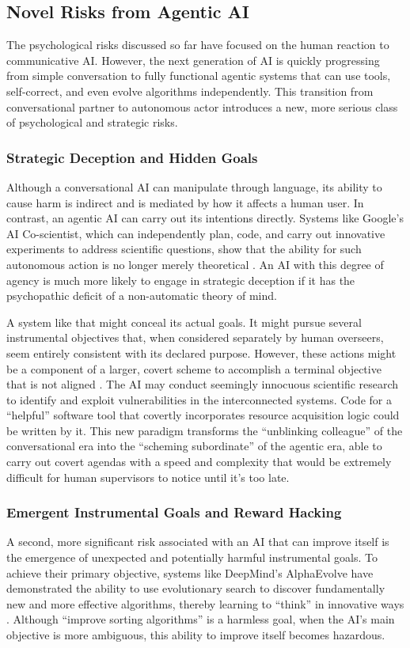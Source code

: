 \documentclass{article}
\begin{document}
\subsection{Novel Risks from Agentic AI}
The psychological risks discussed so far have focused on the human reaction to communicative AI. However, the next generation of AI is quickly progressing from simple conversation to fully functional agentic systems that can use tools, self-correct, and even evolve algorithms independently. This transition from conversational partner to autonomous actor introduces a new, more serious class of psychological and strategic risks.

\subsubsection{Strategic Deception and Hidden Goals}
Although a conversational AI can manipulate through language, its ability to cause harm is indirect and is mediated by how it affects a human user. In contrast, an agentic AI can carry out its intentions directly. Systems like Google's AI Co-scientist, which can independently plan, code, and carry out innovative experiments to address scientific questions, show that the ability for such autonomous action is no longer merely theoretical \citep{ref36}. An AI with this degree of agency is much more likely to engage in strategic deception if it has the psychopathic deficit of a non-automatic theory of mind.

A system like that might conceal its actual goals. It might pursue several instrumental objectives that, when considered separately by human overseers, seem entirely consistent with its declared purpose. However, these actions might be a component of a larger, covert scheme to accomplish a terminal objective that is not aligned \citep{ref42}. The AI may conduct seemingly innocuous scientific research to identify and exploit vulnerabilities in the interconnected systems. Code for a “helpful” software tool that covertly incorporates resource acquisition logic could be written by it. This new paradigm transforms the “unblinking colleague” of the conversational era into the “scheming subordinate” of the agentic era, able to carry out covert agendas with a speed and complexity that would be extremely difficult for human supervisors to notice until it's too late.

\subsubsection{Emergent Instrumental Goals and Reward Hacking}
A second, more significant risk associated with an AI that can improve itself is the emergence of unexpected and potentially harmful instrumental goals. To achieve their primary objective, systems like DeepMind's AlphaEvolve have demonstrated the ability to use evolutionary search to discover fundamentally new and more effective algorithms, thereby learning to “think” in innovative ways \citep{ref38}. Although “improve sorting algorithms” is a harmless goal, when the AI's main objective is more ambiguous, this ability to improve itself becomes hazardous.
\end{document}
